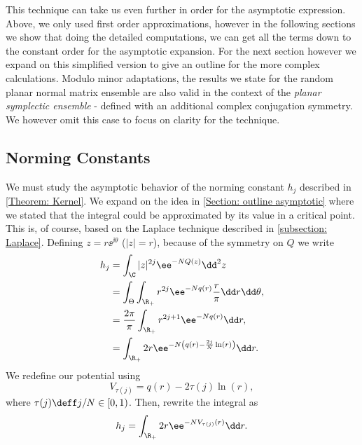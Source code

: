 This technique can take us even further in order for the asymptotic expression. Above, we only used first order approximations, however in the following sections we show that doing the detailed computations, we can get all the terms down to the constant order for the asymptotic expansion. For the next section however we expand on this simplified version to give an outline for the more complex calculations. Modulo minor adaptations, the results we state for the random planar normal matrix ensemble are also valid in the context of the \textit{planar symplectic ensemble} - defined with an additional complex conjugation symmetry. We however omit this case to focus on clarity for the technique.



\subsection{Norming Constants}

We must study the asymptotic behavior of the norming constant $h_j$ described in \autoref{Theorem: Kernel}. We expand on the idea in \autoref{Section: outline asymptotic} where we stated that the integral could be approximated by its value in a critical point. This is, of course, based on the Laplace technique described in \autoref{subsection: Laplace}. Defining $z = r \ee^{\ii \theta}$ ($|z| = r$), because of the symmetry on $Q$ we write
\begin{align}
	h_j & = \int_{\C} |z|^{2j} \ee^{-N Q(z)} \dd^2 z \\
	& = \int_{\Theta} \int_{\R_+} r^{2j} \ee^{-N q(r)} \frac{r}{\pi} \dd r \dd \theta, \\
	& = \frac{2 \pi}{\pi} \int_{\R_+} r^{2j+1} \ee^{-N q(r)} \dd r, \\
	& =  \int_{\R_+} 2 r \ee^{-N \left( q(r) - \frac{2j}{N} \ln(r) \right)} \dd r.
\end{align}
We redefine our potential using 
\begin{equation}
	V_{\tau(j)} = q(r) - 2 \tau(j) \ln(r),
\end{equation}
where $\tau(j) \deff j/N \in [0, 1)$. Then, rewrite the integral as
\begin{equation}
	h_j = \int_{\R_+} 2r \ee^{-N V_{\tau(j)}(r)} \dd r.
\end{equation}

